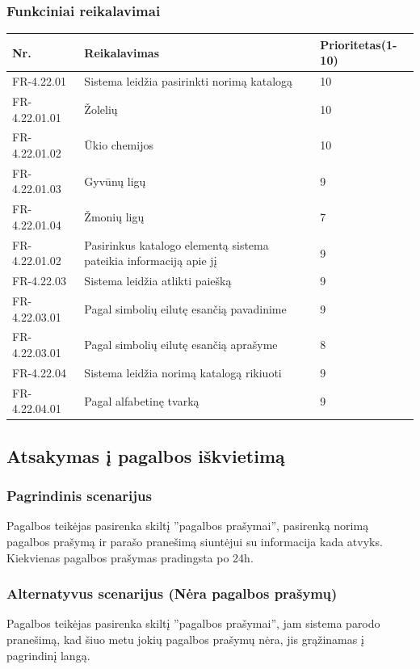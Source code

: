 \documentclass[oneside]{VUMIFPSkursinis}
\begin{document}
	\subsubsection{Funkciniai reikalavimai}
	\begin{table}[htbp]
		\begin{tabularx}{1\textwidth}{ |P{2.5cm}|X|P{3cm }| }  \hline
			Nr. & Reikalavimas & Prioritetas(1-10) \\ \hline
			FR-4.22.01 & Sistema leidžia pasirinkti norimą katalogą & 10 \\ \hline
			FR-4.22.01.01 & Žolelių & 10 \\ \hline
			FR-4.22.01.02 & Ūkio chemijos & 10 \\ \hline
			FR-4.22.01.03 & Gyvūnų ligų & 9 \\ \hline
			FR-4.22.01.04 & Žmonių ligų & 7 \\ \hline
			FR-4.22.01.02 & Pasirinkus katalogo elementą sistema pateikia informaciją apie jį & 9 \\ \hline
			FR-4.22.03 & Sistema leidžia atlikti paiešką  & 9 \\ \hline
			FR-4.22.03.01 & Pagal simbolių eilutę esančią pavadinime & 9 \\ \hline
			FR-4.22.03.01 & Pagal simbolių eilutę esančią aprašyme & 8 \\ \hline
			FR-4.22.04 & Sistema leidžia norimą katalogą rikiuoti & 9 \\ \hline
			FR-4.22.04.01 & Pagal alfabetinę tvarką  & 9 \\ \hline
		\end{tabularx}
	\end{table}
	
	\subsection{Atsakymas į pagalbos iškvietimą}
	\subsubsection{Pagrindinis scenarijus}
	Pagalbos teikėjas pasirenka skiltį ''pagalbos prašymai'', pasirenką norimą pagalbos prašymą ir parašo pranešimą siuntėjui su informacija kada atvyks. Kiekvienas pagalbos prašymas pradingsta po 24h.
	\subsubsection{Alternatyvus scenarijus (Nėra pagalbos prašymų)}
	Pagalbos teikėjas pasirenka skiltį ''pagalbos prašymai'', jam sistema parodo pranešimą, kad šiuo metu jokių pagalbos prašymų nėra, jis grąžinamas į pagrindinį langą.
\end{document}
